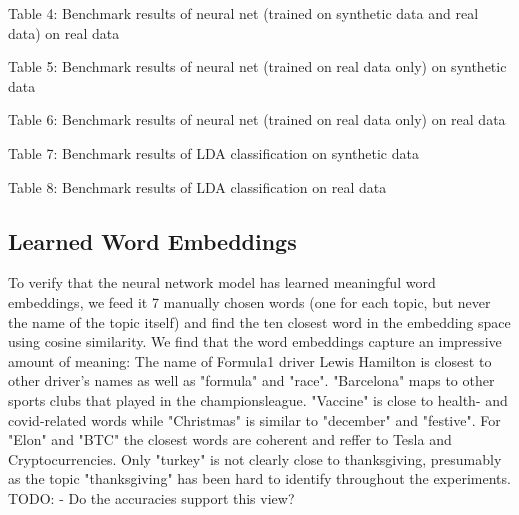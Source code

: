 \documentclass[11pt]{article}
\begin{document}
\begin{center}

\end{center}
\begin{center}
Table 4: Benchmark results of neural net (trained on synthetic data and real data) on real data
\end{center}

\begin{center}

\end{center}
\begin{center}
Table 5: Benchmark results of neural net (trained on real data only) on synthetic data
\end{center}


\begin{center}

\end{center}
\begin{center}
Table 6: Benchmark results of neural net (trained on real data only) on real data
\end{center}


\begin{center}

\end{center}
\begin{center}
Table 7: Benchmark results of LDA classification on synthetic data
\end{center}

\begin{center}

\end{center}
\begin{center}
Table 8: Benchmark results of LDA classification on real data
\end{center}


\subsection{Learned Word Embeddings}
To verify that the neural network model has learned meaningful word embeddings, we feed it 7 manually chosen words (one for each topic, but never the name of the topic itself) and find the ten closest word in the embedding space using cosine similarity. We find that the word embeddings capture an impressive amount of meaning: The name of Formula1 driver Lewis Hamilton is closest to other driver's names as well as "formula" and "race". "Barcelona" maps to other sports clubs that played in the championsleague. "Vaccine" is close to health- and covid-related words while "Christmas" is similar to "december" and "festive". For "Elon" and "BTC" the closest words are coherent and reffer to Tesla and Cryptocurrencies. Only "turkey" is not clearly close to thanksgiving, presumably as the topic "thanksgiving" has been hard to identify throughout the experiments.
TODO:
- Do the accuracies support this view?
\end{document}
